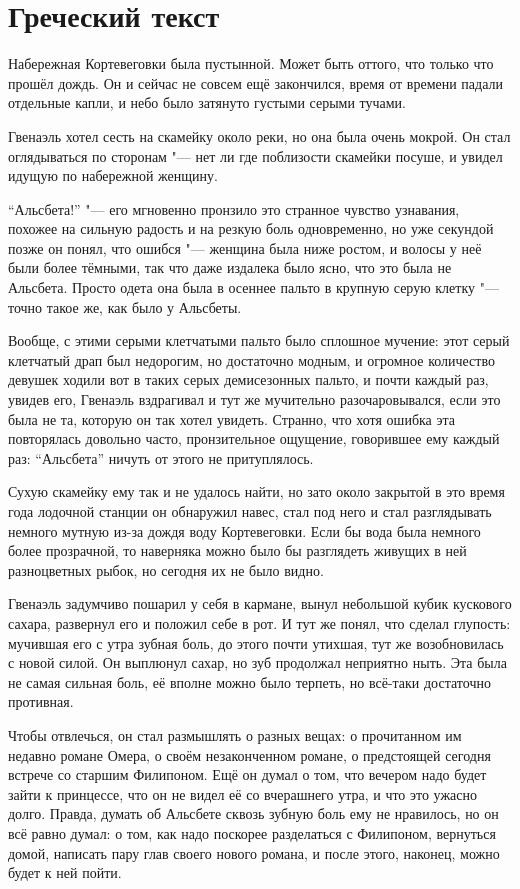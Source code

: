 \section{Греческий текст}

Набережная Кортевеговки была пустынной.
Может быть оттого, что только что прошёл дождь.
Он и сейчас не совсем ещё закончился, время от времени падали отдельные капли,
и небо было затянуто густыми серыми тучами.

Гвенаэль хотел сесть на скамейку около реки, но она была очень мокрой.
Он стал оглядываться по сторонам "--- нет ли где поблизости скамейки посуше, и
увидел идущую по набережной женщину.

\enquote{Альсбета!} "--- его мгновенно пронзило это странное чувство узнавания,
похожее на сильную радость и на резкую боль одновременно, но уже секундой позже
он понял, что ошибся "--- женщина была ниже ростом, и волосы у неё были более
тёмными, так что даже издалека было ясно, что это была не Альсбета.
Просто одета она была в осеннее пальто в крупную серую клетку "--- точно такое
же, как было у Альсбеты.

Вообще, с этими серыми клетчатыми пальто было сплошное мучение: этот серый
клетчатый драп был недорогим, но достаточно модным, и огромное количество
девушек ходили вот в таких серых демисезонных пальто, и почти каждый раз,
увидев его, Гвенаэль вздрагивал и тут же мучительно разочаровывался, если это
была не та, которую он так хотел увидеть.
Странно, что хотя ошибка эта повторялась довольно часто, пронзительное
ощущение, говорившее ему каждый раз: \enquote{Альсбета} ничуть от этого не
притуплялось.

Сухую скамейку ему так и не удалось найти, но зато около закрытой в это время
года лодочной станции он обнаружил навес, стал под него и стал разглядывать
немного мутную из-за дождя воду Кортевеговки.
Если бы вода была немного более прозрачной, то наверняка можно было бы
разглядеть живущих в ней разноцветных рыбок, но сегодня их не было видно.

Гвенаэль задумчиво пошарил у себя в кармане, вынул небольшой кубик кускового
сахара, развернул его и положил себе в рот.
И тут же понял, что сделал глупость: мучившая его с утра зубная боль, до этого
почти утихшая, тут же возобновилась с новой силой.
Он выплюнул сахар, но зуб продолжал неприятно ныть.
Эта была не самая сильная боль, её вполне можно было терпеть, но всё-таки
достаточно противная.

Чтобы отвлечься, он стал размышлять о разных вещах: о прочитанном им недавно
романе Омера, о своём незаконченном романе, о предстоящей сегодня встрече со
старшим Филипоном.
Ещё он думал о том, что вечером надо будет зайти к принцессе, что он не видел
её со вчерашнего утра, и что это ужасно долго.
Правда, думать об Альсбете сквозь зубную боль ему не нравилось, но он всё равно
думал: о том, как надо поскорее разделаться с Филипоном, вернуться домой,
написать пару глав своего нового романа, и после этого, наконец, можно будет к
ней пойти.

